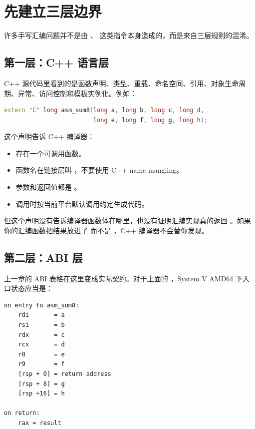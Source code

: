 \section{先建立三层边界}

许多手写汇编问题并不是由 、 这类指令本身造成的，而是来自三层规则的混淆。

\subsection{第一层：C++ 语言层}

C++ 源代码里看到的是函数声明、类型、重载、命名空间、引用、对象生命周期、异常、访问控制和模板实例化。例如：

\begin{lstlisting}[language=C++]
extern "C" long asm_sum8(long a, long b, long c, long d,
                         long e, long f, long g, long h);
\end{lstlisting}

这个声明告诉 C++ 编译器：

\begin{itemize}
  \item 存在一个可调用函数。
  \item 函数名在链接层叫 ，不要使用 C++ name mangling。
  \item 参数和返回值都是 。
  \item 调用时按当前平台默认调用约定生成代码。
\end{itemize}

但这个声明没有告诉编译器函数体在哪里，也没有证明汇编实现真的返回 。如果你的汇编函数把结果放进了  而不是 ，C++ 编译器不会替你发现。

\subsection{第二层：ABI 层}

上一章的 ABI 表格在这里变成实际契约。对于上面的 ，System V AMD64 下入口状态应当是：

\begin{lstlisting}
on entry to asm_sum8:
    rdi       = a
    rsi       = b
    rdx       = c
    rcx       = d
    r8        = e
    r9        = f
    [rsp + 0] = return address
    [rsp + 8] = g
    [rsp +16] = h

on return:
    rax = result
\end{lstlisting}

